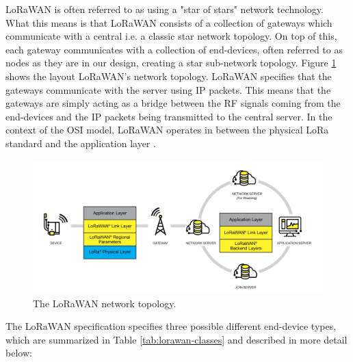 LoRaWAN is often referred to as using a "star of stars" network technology. What this means is that LoRaWAN consists of a collection of gateways which communicate with a central i.e. a classic star network topology. On top of this, each gateway communicates with a collection of end-devices, often referred to as nodes as they are in our design, creating a star sub-network topology. Figure \ref{lorawan-network-stack} shows the layout LoRaWAN's network topology. LoRaWAN specifies that the gateways communicate with the server using IP packets. This means that the gateways are simply acting as a bridge between the RF signals coming from the end-devices and the IP packets being transmitted to the central server. In the context of the OSI model, LoRaWAN operates in between the physical LoRa standard and the application layer \cite{lora-alliance}.

\begin{figure}
    \centering
    \includegraphics[width=6in]{figures/lorawan-stack.png}
    \caption{The LoRaWAN network topology.}
    \label{lorawan-network-stack}
\end{figure}

The LoRaWAN specification specifies three possible different end-device types, which are summarized in Table \ref{tab:lorawan-classes} and described in more detail below:

